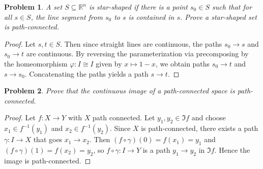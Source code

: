 \documentclass[11pt, letterpaper]{article}
\theoremstyle{plain}
\newtheorem{problem}{Problem}
\begin{document}
\begin{problem}
	A set $S\subseteq \mathbb{R} ^n$ is \emph{star-shaped} if there is a point $s_0\in S$ such that for all $s\in S$, the line segment from $s_0$ to $s$ is contained in $s$. Prove a star-shaped set is path-connected.
\end{problem}
\begin{proof}
	Let $s,t\in S$. Then since straight lines are continuous, the paths $s_0\to s$ and $s_0\to t$ are continuous. By reversing the parameterization via precomposing by the homeomorphism $\varphi : I \cong I$ given by $x\mapsto 1-x$, we obtain paths $s_0\to t$ and $s\to s_0$. Concatenating the paths yields a path $s\to t$.
\end{proof}
\begin{problem}
	Prove that the continuous image of a path-connected space is path-connected.
\end{problem}
\begin{proof}
	Let $f : X \to Y$ with $X$ path connected. Let $y_1,y_2\in \Im f$ and choose $x_1\in f^{-1} (y_1)$ and $x_2\in f^{-1} (y_2)$. Since $X$ is path-connected, there exists a path $\gamma : I \to X$ that goes $x_1 \to x_2$. Then $(f\circ \gamma )(0)=f(x_1)=y_1$ and $(f\circ \gamma )(1)=f(x_2)=y_2$, so $f\circ \gamma : I \to Y$ is a path $y_1\to y_2$ in $\Im f$. Hence the image is path-connected.
\end{proof}
\end{document}
